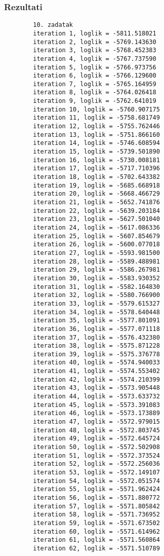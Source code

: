 \documentclass[12pt]{article}
\begin{document}
	\subsubsection*{Rezultati}
	\begin{verbatim}
		10. zadatak
		iteration 1, loglik = -5811.518021
		iteration 2, loglik = -5769.143630
		iteration 3, loglik = -5768.452383
		iteration 4, loglik = -5767.737590
		iteration 5, loglik = -5766.973756
		iteration 6, loglik = -5766.129600
		iteration 7, loglik = -5765.164959
		iteration 8, loglik = -5764.026418
		iteration 9, loglik = -5762.641019
		iteration 10, loglik = -5760.907175
		iteration 11, loglik = -5758.681749
		iteration 12, loglik = -5755.762446
		iteration 13, loglik = -5751.866160
		iteration 14, loglik = -5746.608594
		iteration 15, loglik = -5739.501890
		iteration 16, loglik = -5730.008181
		iteration 17, loglik = -5717.710396
		iteration 18, loglik = -5702.643382
		iteration 19, loglik = -5685.668918
		iteration 20, loglik = -5668.466729
		iteration 21, loglik = -5652.741876
		iteration 22, loglik = -5639.203184
		iteration 23, loglik = -5627.501040
		iteration 24, loglik = -5617.086336
		iteration 25, loglik = -5607.854679
		iteration 26, loglik = -5600.077018
		iteration 27, loglik = -5593.981500
		iteration 28, loglik = -5589.488981
		iteration 29, loglik = -5586.267981
		iteration 30, loglik = -5583.930352
		iteration 31, loglik = -5582.164830
		iteration 32, loglik = -5580.766900
		iteration 33, loglik = -5579.615327
		iteration 34, loglik = -5578.640448
		iteration 35, loglik = -5577.801091
		iteration 36, loglik = -5577.071118
		iteration 37, loglik = -5576.432380
		iteration 38, loglik = -5575.871228
		iteration 39, loglik = -5575.376778
		iteration 40, loglik = -5574.940033
		iteration 41, loglik = -5574.553402
		iteration 42, loglik = -5574.210399
		iteration 43, loglik = -5573.905448
		iteration 44, loglik = -5573.633732
		iteration 45, loglik = -5573.391083
		iteration 46, loglik = -5573.173889
		iteration 47, loglik = -5572.979015
		iteration 48, loglik = -5572.803745
		iteration 49, loglik = -5572.645724
		iteration 50, loglik = -5572.502908
		iteration 51, loglik = -5572.373524
		iteration 52, loglik = -5572.256036
		iteration 53, loglik = -5572.149107
		iteration 54, loglik = -5572.051574
		iteration 55, loglik = -5571.962424
		iteration 56, loglik = -5571.880772
		iteration 57, loglik = -5571.805842
		iteration 58, loglik = -5571.736952
		iteration 59, loglik = -5571.673502
		iteration 60, loglik = -5571.614962
		iteration 61, loglik = -5571.560864
		iteration 62, loglik = -5571.510789

\end{verbatim}
\end{document}
